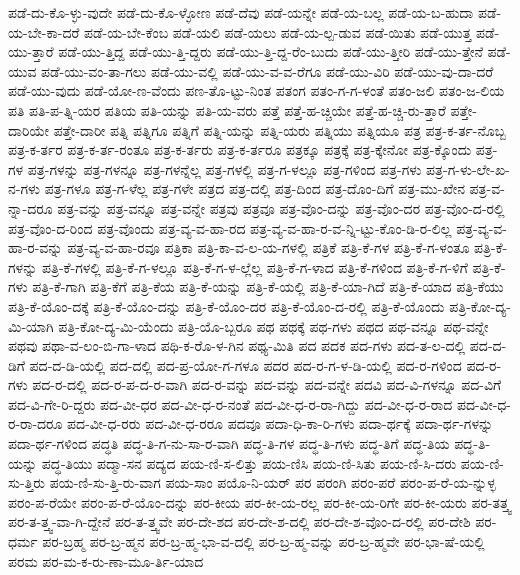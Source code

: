 {ಪಡೆ-ದು-ಕೊ-ಳ್ಳು-ವುದೇ
ಪಡೆ-ದು-ಕೊ-ಳ್ಳೋಣ
ಪಡೆ-ದೆವು
ಪಡೆ-ಯನ್ನೇ
ಪಡೆ-ಯ-ಬಲ್ಲ
ಪಡೆ-ಯ-ಬ-ಹುದಾ
ಪಡೆ-ಯ-ಬೇ-ಕಾ-ದರೆ
ಪಡೆ-ಯ-ಬೇ-ಕೆಂಬ
ಪಡೆ-ಯಲಿ
ಪಡೆ-ಯಲು
ಪಡೆ-ಯ-ಲ್ಪ-ಡುವ
ಪಡೆ-ಯಿತು
ಪಡೆ-ಯುತ್ತ
ಪಡೆ-ಯು-ತ್ತಾರೆ
ಪಡೆ-ಯು-ತ್ತಿದ್ದ
ಪಡೆ-ಯು-ತ್ತಿ-ದ್ದರು
ಪಡೆ-ಯು-ತ್ತಿ-ದ್ದ-ರೆಂ-ಬುದು
ಪಡೆ-ಯು-ತ್ತೀರಿ
ಪಡೆ-ಯು-ತ್ತೇನೆ
ಪಡೆ-ಯುವ
ಪಡೆ-ಯು-ವಂ-ತಾ-ಗಲು
ಪಡೆ-ಯು-ವಲ್ಲಿ
ಪಡೆ-ಯು-ವ-ವ-ರೆಗೂ
ಪಡೆ-ಯು-ವಿರಿ
ಪಡೆ-ಯು-ವು-ದಾ-ದರೆ
ಪಡೆ-ಯು-ವುದು
ಪಡೆ-ಯೋ-ಣ-ವೆಂದು
ಪಣ-ತೊ-ಟ್ಟು-ನಿಂತ
ಪತಂಗ
ಪತಂ-ಗ-ಗ-ಳಂತೆ
ಪತಂ-ಜಲಿ
ಪತಂ-ಜ-ಲಿಯ
ಪತಿ
ಪತಿ-ಪ-ತ್ನಿ-ಯರ
ಪತಿಯ
ಪತಿ-ಯನ್ನು
ಪತಿ-ಯ-ವರು
ಪತ್ತೆ
ಪತ್ತೆ-ಹ-ಚ್ಚಿಯೇ
ಪತ್ತೆ-ಹ-ಚ್ಚಿ-ರು-ತ್ತಾರೆ
ಪತ್ತೇ-ದಾರಿಯೇ
ಪತ್ತೇ-ದಾರೀ
ಪತ್ನಿ
ಪತ್ನಿಗೂ
ಪತ್ನಿಗೆ
ಪತ್ನಿ-ಯನ್ನು
ಪತ್ನಿ-ಯರು
ಪತ್ನಿಯು
ಪತ್ನಿಯೂ
ಪತ್ರ
ಪತ್ರ-ಕ-ರ್ತ-ನೊಬ್ಬ
ಪತ್ರ-ಕ-ರ್ತರ
ಪತ್ರ-ಕ-ರ್ತ-ರಂತೂ
ಪತ್ರ-ಕ-ರ್ತರು
ಪತ್ರ-ಕ-ರ್ತರೂ
ಪತ್ರಕ್ಕೂ
ಪತ್ರಕ್ಕೆ
ಪತ್ರ-ಕ್ಕೇನೋ
ಪತ್ರ-ಕ್ಕೊಂದು
ಪತ್ರ-ಗಳ
ಪತ್ರ-ಗಳನ್ನು
ಪತ್ರ-ಗಳನ್ನೂ
ಪತ್ರ-ಗಳನ್ನೆಲ್ಲ
ಪತ್ರ-ಗಳಲ್ಲಿ
ಪತ್ರ-ಗ-ಳಲ್ಲೂ
ಪತ್ರ-ಗಳಿಂದ
ಪತ್ರ-ಗಳು
ಪತ್ರ-ಗ-ಳು-ಲೇ-ಖ-ನ-ಗಳು
ಪತ್ರ-ಗಳೂ
ಪತ್ರ-ಗ-ಳೆಲ್ಲ
ಪತ್ರ-ಗಳೇ
ಪತ್ರದ
ಪತ್ರ-ದಲ್ಲಿ
ಪತ್ರ-ದಿಂದ
ಪತ್ರ-ದೊಂ-ದಿಗೆ
ಪತ್ರ-ಮು-ಖೇನ
ಪತ್ರ-ವ-ನ್ನಾ-ದರೂ
ಪತ್ರ-ವನ್ನು
ಪತ್ರ-ವನ್ನೂ
ಪತ್ರ-ವನ್ನೇ
ಪತ್ರವು
ಪತ್ರವೂ
ಪತ್ರ-ವೊಂ-ದನ್ನು
ಪತ್ರ-ವೊಂ-ದರ
ಪತ್ರ-ವೊಂ-ದ-ರಲ್ಲಿ
ಪತ್ರ-ವೊಂ-ದ-ರಿಂದ
ಪತ್ರ-ವೊಂದು
ಪತ್ರ-ವ್ಯ-ವ-ಹಾ-ರದ
ಪತ್ರ-ವ್ಯ-ವ-ಹಾ-ರ-ವ-ನ್ನಿ-ಟ್ಟು-ಕೊಂ-ಡಿ-ರ-ಲಿಲ್ಲ
ಪತ್ರ-ವ್ಯ-ವ-ಹಾ-ರ-ವನ್ನು
ಪತ್ರ-ವ್ಯ-ವ-ಹಾ-ರವೂ
ಪತ್ರಿಕಾ
ಪತ್ರಿ-ಕಾ-ವ-ಲ-ಯ-ಗಳಲ್ಲಿ
ಪತ್ರಿಕೆ
ಪತ್ರಿ-ಕೆ-ಗಳ
ಪತ್ರಿ-ಕೆ-ಗ-ಳಂತೂ
ಪತ್ರಿ-ಕೆ-ಗಳನ್ನು
ಪತ್ರಿ-ಕೆ-ಗಳಲ್ಲಿ
ಪತ್ರಿ-ಕೆ-ಗ-ಳಲ್ಲೂ
ಪತ್ರಿ-ಕೆ-ಗ-ಳ-ಲ್ಲೆಲ್ಲ
ಪತ್ರಿ-ಕೆ-ಗ-ಳಾದ
ಪತ್ರಿ-ಕೆ-ಗಳಿಂದ
ಪತ್ರಿ-ಕೆ-ಗ-ಳಿಗೆ
ಪತ್ರಿ-ಕೆ-ಗಳು
ಪತ್ರಿ-ಕೆ-ಗಾಗಿ
ಪತ್ರಿ-ಕೆಗೆ
ಪತ್ರಿ-ಕೆಯ
ಪತ್ರಿ-ಕೆ-ಯನ್ನು
ಪತ್ರಿ-ಕೆ-ಯಲ್ಲಿ
ಪತ್ರಿ-ಕೆ-ಯಾ-ಗಿದೆ
ಪತ್ರಿ-ಕೆ-ಯಾದ
ಪತ್ರಿ-ಕೆಯು
ಪತ್ರಿ-ಕೆ-ಯೊಂ-ದಕ್ಕೆ
ಪತ್ರಿ-ಕೆ-ಯೊಂ-ದನ್ನು
ಪತ್ರಿ-ಕೆ-ಯೊಂ-ದರ
ಪತ್ರಿ-ಕೆ-ಯೊಂ-ದ-ರಲ್ಲಿ
ಪತ್ರಿ-ಕೆ-ಯೊಂದು
ಪತ್ರಿ-ಕೋ-ದ್ಯ-ಮಿ-ಯಾಗಿ
ಪತ್ರಿ-ಕೋ-ದ್ಯ-ಮಿ-ಯೆಂದು
ಪತ್ರಿ-ಯೊ-ಬ್ಬರೂ
ಪಥ
ಪಥಕ್ಕೆ
ಪಥ-ಗಳು
ಪಥದ
ಪಥ-ವನ್ನೂ
ಪಥ-ವನ್ನೇ
ಪಥವು
ಪಥಾ-ವ-ಲಂ-ಬಿ-ಗಾ-ಳಾದ
ಪಥಿ-ಕ-ರೊ-ಳ-ಗಿನ
ಪಥ್ಯ-ಮಿತಿ
ಪದ
ಪದಕ
ಪದ-ಗಳು
ಪದ-ತ-ಲ-ದಲ್ಲಿ
ಪದ-ದ-ಡಿಗೆ
ಪದ-ದ-ಡಿ-ಯಲ್ಲಿ
ಪದ-ದಲ್ಲಿ
ಪದ-ಪ್ರ-ಯೋ-ಗ-ಗಳೂ
ಪದರ
ಪದ-ರ-ಗ-ಳ-ಡಿ-ಯಲ್ಲಿ
ಪದ-ರ-ಗಳಿಂದ
ಪದ-ರ-ಗಳು
ಪದ-ರ-ದಲ್ಲಿ
ಪದ-ರ-ಪ-ದ-ರ-ವಾಗಿ
ಪದ-ರ-ವನ್ನು
ಪದ-ವನ್ನು
ಪದ-ವನ್ನೇ
ಪದವಿ
ಪದ-ವಿ-ಗಳನ್ನೂ
ಪದ-ವಿಗೆ
ಪದ-ವಿ-ಗೇ-ರಿ-ದ್ದರು
ಪದ-ವೀ-ಧರ
ಪದ-ವೀ-ಧ-ರ-ನಂತೆ
ಪದ-ವೀ-ಧ-ರ-ರಾ-ಗಿದ್ದು
ಪದ-ವೀ-ಧ-ರ-ರಾದ
ಪದ-ವೀ-ಧ-ರ-ರಾ-ದರೂ
ಪದ-ವೀ-ಧ-ರರು
ಪದ-ವೀ-ಧ-ರರೂ
ಪದವೂ
ಪದಾ-ಧಿ-ಕಾ-ರಿ-ಗಳು
ಪದಾ-ರ್ಥಕ್ಕೆ
ಪದಾ-ರ್ಥ-ಗಳನ್ನು
ಪದಾ-ರ್ಥ-ಗಳಿಂದ
ಪದ್ಧತಿ
ಪದ್ಧ-ತಿ-ಗ-ನು-ಸಾ-ರ-ವಾಗಿ
ಪದ್ಧ-ತಿ-ಗಳ
ಪದ್ಧ-ತಿ-ಗಳು
ಪದ್ಧ-ತಿಗೆ
ಪದ್ಧ-ತಿಯ
ಪದ್ಧ-ತಿ-ಯನ್ನು
ಪದ್ಧ-ತಿಯು
ಪದ್ಮಾ-ಸನ
ಪದ್ಯದ
ಪಯ-ಣಿ-ಸ-ಲಿತ್ತು
ಪಯ-ಣಿಸಿ
ಪಯ-ಣಿ-ಸಿತು
ಪಯ-ಣಿ-ಸಿ-ದರು
ಪಯ-ಣಿ-ಸು-ತ್ತಿರು
ಪಯ-ಣಿ-ಸು-ತ್ತಿ-ರು-ವಾಗ
ಪಯ-ಸಾಂ
ಪಯೊ-ನಿ-ಯರ್
ಪರ
ಪರಂಗಿ
ಪರಂ-ಪರೆ
ಪರಂ-ಪ-ರೆ-ಯ-ನ್ನುಳ್ಳ
ಪರಂ-ಪ-ರೆಯೇ
ಪರಂ-ಪ-ರೆ-ಯೊಂ-ದನ್ನು
ಪರ-ಕೀಯ
ಪರ-ಕೀ-ಯ-ರಲ್ಲ
ಪರ-ಕೀ-ಯ-ರಿಗೇ
ಪರ-ಕೀ-ಯರು
ಪರ-ತತ್ತ್ವ
ಪರ-ತ-ತ್ತ್ವ-ವಾ-ಗಿ-ದ್ದೇನೆ
ಪರ-ತ-ತ್ತ್ವವೇ
ಪರ-ದೇ-ಶದ
ಪರ-ದೇ-ಶ-ದಲ್ಲಿ
ಪರ-ದೇ-ಶ-ವೊಂ-ದ-ರಲ್ಲಿ
ಪರ-ದೇಶಿ
ಪರ-ಧರ್ಮ
ಪರ-ಬ್ರಹ್ಮ
ಪರ-ಬ್ರ-ಹ್ಮನ
ಪರ-ಬ್ರ-ಹ್ಮ-ಭಾ-ವ-ದಲ್ಲಿ
ಪರ-ಬ್ರ-ಹ್ಮ-ವನ್ನು
ಪರ-ಬ್ರ-ಹ್ಮವೇ
ಪರ-ಭಾ-ಷೆ-ಯಲ್ಲಿ
ಪರಮ
ಪರ-ಮ-ಕ-ರು-ಣಾ-ಮೂ-ರ್ತಿ-ಯಾದ
}
